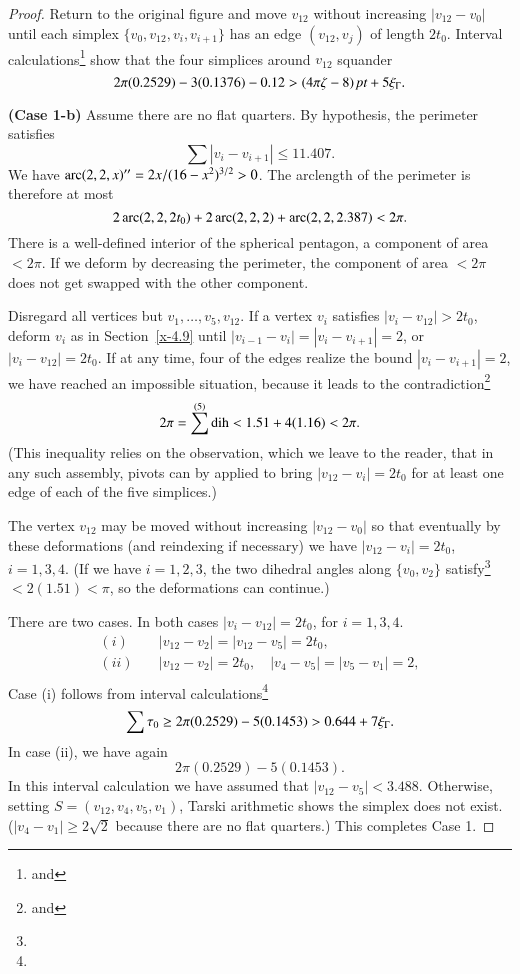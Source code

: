 \begin{proof}
Return to the original figure and move $v_{12}$ without increasing
$|v_{12}-v_0|$ until each simplex $\{v_0,v_{12},v_i,v_{i+1}\}$ has an edge
$(v_{12},v_j)$ of length $2t_0$. Interval
calculations\footnote{ and } show
that the four simplices around $v_{12}$ squander
    $$2\pi(0.2529)-3(0.1376)-0.12 > (4\pi\zeta-8)\,\hbox{\it pt} + 5\xi_\Gamma.$$

{\bf (Case 1-b)} Assume there are no flat quarters. By hypothesis,
the perimeter satisfies $$\sum|v_i-v_{i+1}|\le 11.407.$$ We have
$\operatorname{arc}(2,2,x)'' = 2x/(16-x^2)^{3/2} >0$. The arclength of the
perimeter is therefore at most
$$2\operatorname{arc}(2,2,2t_0) + 2\operatorname{arc}(2,2,2) + \operatorname{arc}(2,2,2.387) <  2\pi.$$
There is a well-defined interior of the spherical pentagon, a
component of area $<2\pi$.  If we deform by decreasing the
perimeter, the component of area $<2\pi$ does not get swapped with
the other component.

Disregard all vertices but $v_1,\ldots,v_5,v_{12}$.  If a vertex
$v_i$ satisfies  $|v_i-v_{12}|>2t_0$, deform $v_i$ as in
Section~\ref{x-4.9} until $|v_{i-1}-v_{i}|=|v_i-v_{i+1}|=2$, or
$|v_i-v_{12}|=2t_0$. If at any time, four of the edges realize the
bound $|v_i-v_{i+1}|=2$, we have reached an impossible situation,
because it leads to the contradiction\footnote{
and }
    $$2\pi = \sum^{(5)}\operatorname{dih} < 1.51 + 4 (1.16) < 2\pi.$$
(This inequality relies on the observation, which we leave to the
reader, that in any such assembly, pivots can by applied to bring
$|v_{12}-v_i|=2t_0$ for at least one edge of each of the five
simplices.)



The vertex $v_{12}$ may be moved without increasing $|v_{12}-v_0|$ so
that eventually by these deformations (and reindexing if
necessary) we have $|v_{12}-v_i|=2t_0$, $i=1,3,4$. (If we have
$i=1,2,3$, the two dihedral angles along $\{v_0,v_2\}$
satisfy\footnote{} $<2(1.51)<\pi$, so the
deformations can continue.)



There are two cases. In both cases $|v_i-v_{12}|=2t_0$, for
$i=1,3,4$.
$$
\begin{array}{lll}
(i)\quad &|v_{12}-v_2|=|v_{12}-v_5|=2t_0,\\
(ii)\quad &|v_{12}-v_2|=2t_0,\quad |v_4-v_5|=|v_5-v_1|=2,\\
\end{array}
$$
Case (i) follows from interval
calculations\footnote{}
$$
\sum\tau_0 \ge 2\pi(0.2529) - 5 (0.1453) > 0.644+7\xi_\Gamma.
$$
In case (ii), we have again
    $$2\pi(0.2529)-5 (0.1453).$$
In this interval calculation we have assumed that
$|v_{12}-v_5|<3.488$. Otherwise, setting $S=(v_{12},v_4,v_5,v_1)$, Tarski arithmetic
shows the simplex does not exist.
($|v_4-v_1|\ge2\sqrt2$ because
there are no flat quarters.)
This completes Case 1.


\end{proof}
